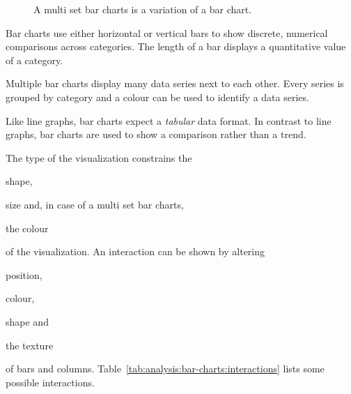 \begin{figure}
  \caption{A multi set bar charts is a variation of a bar chart.}
  \label{fig:analysis:bar-charts}
  \begin{center}
    \qquad
  \end{center}
\end{figure}

Bar charts use either horizontal or vertical bars to show discrete, numerical comparisons across categories.
The length of a bar displays a quantitative value of a category.

Multiple bar charts display many data series next to each other.
Every series is grouped by category and a colour can be used to identify a data series.

Like line graphs, bar charts expect a \emph{tabular} data format.
In contrast to line graphs, bar charts are used to show a comparison rather than a trend.

The type of the visualization constrains the
\begin{enumerate*}[label=(\arabic*)]
    \item shape,
    \item size and, in case of a multi set bar charts,
    \item the colour
\end{enumerate*}
of the visualization.
An interaction can be shown by altering
\begin{enumerate*}[label=(\arabic*)]
    \item position,
    \item colour,
    \item shape and
    \item the texture
\end{enumerate*}
of bars and columns.
Table~\ref{tab:analysis:bar-charts:interactions} lists some possible interactions.


